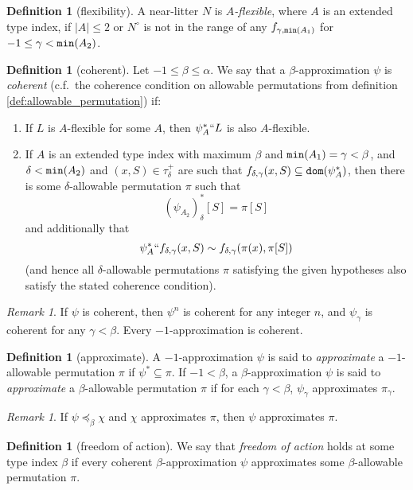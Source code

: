 \documentclass[112pt]{article}
\theoremstyle{definition}
\newtheorem{definition}[theorem]{Definition}
\theoremstyle{remark}
\newtheorem{remark}[theorem]{Remark}
\begin{document}
\begin{definition}[flexibility]\label{def:flexible}
  A near-litter $N$ is {\em  $A$-flexible\/}, where $A$ is an extended type index,  if $|A| \leq 2$ or $N^\circ$ is not in the range of any $f_{\gamma,{\tt min}(A_1)}$
for $-1 \leq \gamma<{\tt min}(A_2)$.  
\end{definition}
\begin{definition}[coherent]\label{def:coherent}
  Let $-1 \leq \beta \leq \alpha$.
  We say that a $\beta$-approximation $\psi$ is {\em coherent\/} (c.f.\ the coherence condition on allowable permutations from definition \ref{def:allowable_permutation}) if:
  \begin{enumerate}
    \item If $L$ is $A$-flexible for some $A$, then $\psi_A^*`` L$ is also $A$-flexible.
    \item If $A$ is an extended type index with maximum $\beta$ and ${\tt min}(A_1) = \gamma < \beta$, and $\delta < {\tt min}(A_2)$ and $(x, S) \in \tau_\delta^+$ are such that $f_{\delta,\gamma}(x, S) \subseteq {\tt dom}(\psi_A^*)$, then there is some $\delta$-allowable permutation $\pi$ such that
    $$ (\psi_{A_2})_\delta^*[S] = \pi[S] $$
    and additionally that
    $$ \psi_A^* `` f_{\delta,\gamma}(x, S) \sim f_{\delta,\gamma}(\pi(x), \pi[S]) $$
    (and hence all $\delta$-allowable permutations $\pi$ satisfying the given hypotheses also satisfy the stated coherence condition).
  \end{enumerate}
\end{definition}
\begin{remark}\label{rk:power_deriv_coherent}
  If $\psi$ is coherent, then $\psi^n$ is coherent for any integer $n$, and $\psi_\gamma$ is coherent for any $\gamma < \beta$.
  Every $-1$-approximation is coherent.
\end{remark}
\begin{definition}[approximate]
  A $-1$-approximation $\psi$ is said to {\em approximate\/} a $-1$-allowable permutation $\pi$ if $\psi^* \subseteq \pi$.
  If $-1 < \beta$, a $\beta$-approximation $\psi$ is said to {\em approximate\/} a $\beta$-allowable permutation $\pi$ if for each $\gamma < \beta$, $\psi_\gamma$ approximates $\pi_\gamma$.
\end{definition}
\begin{remark}\label{rk:preceq_approximates}
  If $\psi \preceq_\beta \chi$ and $\chi$ approximates $\pi$, then $\psi$ approximates $\pi$.
\end{remark}
\begin{definition}[freedom of action]\label{def:foa}
  We say that {\em freedom of action\/} holds at some type index $\beta$ if every coherent $\beta$-approximation $\psi$ approximates some $\beta$-allowable permutation $\pi$.
\end{definition}
\end{document}
